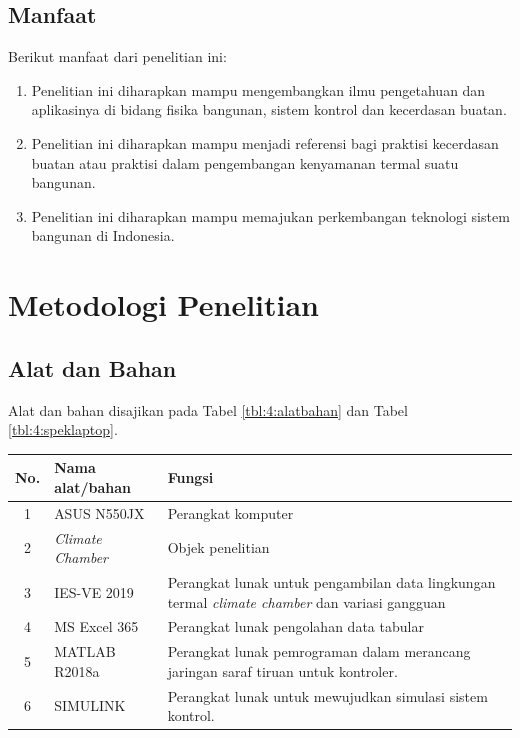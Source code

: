 \documentclass[a4paper,10pt]{article}
\makeatletter
\newenvironment{body}{\begin{multicols}{2}}{\end{multicols}}
\renewenvironment{table}
{\def\@captype{table}%
	\captionsetup{format=plain,labelsep=newline,font=footnotesize,textfont=sc,justification=centering}%
	\fontsize{8}{8}\selectfont
}
{}
\makeatother
\begin{document}
\begin{body}
		\subsection{Manfaat}
		Berikut manfaat dari penelitian ini:
		\begin{enumerate}
			\item Penelitian ini diharapkan mampu mengembangkan ilmu pengetahuan dan aplikasinya di bidang fisika bangunan, sistem kontrol dan kecerdasan buatan.
			\item Penelitian ini diharapkan mampu menjadi referensi bagi praktisi kecerdasan buatan atau praktisi dalam pengembangan kenyamanan termal suatu bangunan.
			\item Penelitian ini diharapkan mampu memajukan perkembangan teknologi sistem bangunan di Indonesia.
		\end{enumerate}
		
		\vspace{2mm}
		
		\section{Metodologi Penelitian}
		
		\subsection{Alat dan Bahan}
		Alat dan bahan disajikan pada Tabel \ref{tbl:4:alatbahan} dan Tabel \ref{tbl:4:speklaptop}.
		
		\begin{table}
			\centering
			\caption{Daftar alat dan bahan}
			\label{tbl:4:alatbahan}
			\fontsize{8}{8}\selectfont
			\begin{tabularx}{\linewidth}{clX}\toprule
				No. & Nama alat/bahan & Fungsi \\
				\toprule
				1 & ASUS N550JX & Perangkat komputer \\ \midrule
				2 & \textit{Climate Chamber} & Objek penelitian \\ \midrule
				3 & IES-VE 2019 & Perangkat lunak untuk pengambilan data lingkungan termal \textit{climate chamber} dan variasi gangguan \\ \midrule
				4 & MS Excel 365 & Perangkat lunak pengolahan data tabular \\ \midrule
				5 & MATLAB R2018a & Perangkat lunak pemrograman dalam merancang jaringan saraf tiruan untuk kontroler. \\ \midrule
				6 & SIMULINK & Perangkat lunak untuk mewujudkan simulasi sistem kontrol. \\ \bottomrule
			\end{tabularx}
		\end{table}
		

\end{body}
\end{document}
